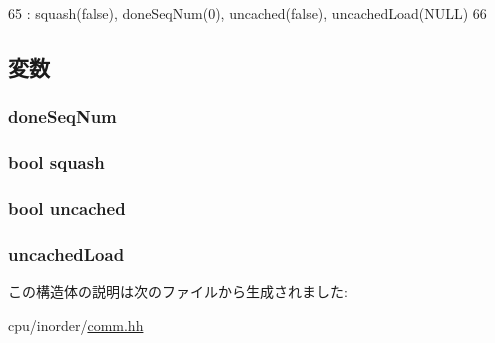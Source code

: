 \begin{DoxyCode}
65             : squash(false), doneSeqNum(0), uncached(false), uncachedLoad(NULL)
66         { }
\end{DoxyCode}


\subsection{変数}
\hypertarget{structTimeStruct_1_1StageComm_a45920c1d79a22b1320274c5f53504654}{
\subsubsection[{doneSeqNum}]{ {\bf doneSeqNum}}}
\label{structTimeStruct_1_1StageComm_a45920c1d79a22b1320274c5f53504654}
\hypertarget{structTimeStruct_1_1StageComm_a61b7f55a2e0399c2eee9f78204b37d8c}{
\subsubsection[{squash}]{\setlength{\rightskip}{0pt plus 5cm}bool {\bf squash}}}
\label{structTimeStruct_1_1StageComm_a61b7f55a2e0399c2eee9f78204b37d8c}
\hypertarget{structTimeStruct_1_1StageComm_aab896ca9f63476ee85c0cac2bbff0811}{
\subsubsection[{uncached}]{\setlength{\rightskip}{0pt plus 5cm}bool {\bf uncached}}}
\label{structTimeStruct_1_1StageComm_aab896ca9f63476ee85c0cac2bbff0811}
\hypertarget{structTimeStruct_1_1StageComm_ae42796598d4714d10cdab6dda7cdf2c2}{
\subsubsection[{uncachedLoad}]{ {\bf uncachedLoad}}}
\label{structTimeStruct_1_1StageComm_ae42796598d4714d10cdab6dda7cdf2c2}


この構造体の説明は次のファイルから生成されました:\begin{DoxyCompactItemize}
\item 
cpu/inorder/\hyperlink{inorder_2comm_8hh}{comm.hh}\end{DoxyCompactItemize}
